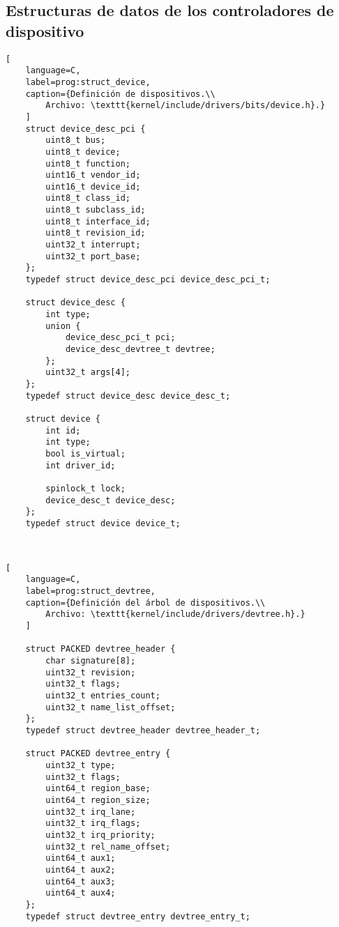 \subsection{Estructuras de datos de los controladores de dispositivo}
\begin{lstlisting}[
	language=C,
	label=prog:struct_device,
	caption={Definición de dispositivos.\\
		Archivo: \texttt{kernel/include/drivers/bits/device.h}.}
	]
	struct device_desc_pci {
		uint8_t bus;
		uint8_t device;
		uint8_t function;
		uint16_t vendor_id;
		uint16_t device_id;
		uint8_t class_id;
		uint8_t subclass_id;
		uint8_t interface_id;
		uint8_t revision_id;
		uint32_t interrupt;
		uint32_t port_base;
	};
	typedef struct device_desc_pci device_desc_pci_t;
	
	struct device_desc {
		int type;
		union {
			device_desc_pci_t pci;
			device_desc_devtree_t devtree;
		};
		uint32_t args[4];
	};
	typedef struct device_desc device_desc_t;
	
	struct device {
		int id;
		int type;
		bool is_virtual;
		int driver_id;
		
		spinlock_t lock;
		device_desc_t device_desc;
	};
	typedef struct device device_t;
	
	
\end{lstlisting}

\begin{lstlisting}[
	language=C,
	label=prog:struct_devtree,
	caption={Definición del árbol de dispositivos.\\
		Archivo: \texttt{kernel/include/drivers/devtree.h}.}
	]
	
	struct PACKED devtree_header {
		char signature[8];
		uint32_t revision;
		uint32_t flags;
		uint32_t entries_count;
		uint32_t name_list_offset;
	};
	typedef struct devtree_header devtree_header_t;
	
	struct PACKED devtree_entry {
		uint32_t type;
		uint32_t flags;
		uint64_t region_base;
		uint64_t region_size;
		uint32_t irq_lane;
		uint32_t irq_flags;
		uint32_t irq_priority;
		uint32_t rel_name_offset;
		uint64_t aux1;
		uint64_t aux2;
		uint64_t aux3;
		uint64_t aux4;
	};
	typedef struct devtree_entry devtree_entry_t;
\end{lstlisting}






